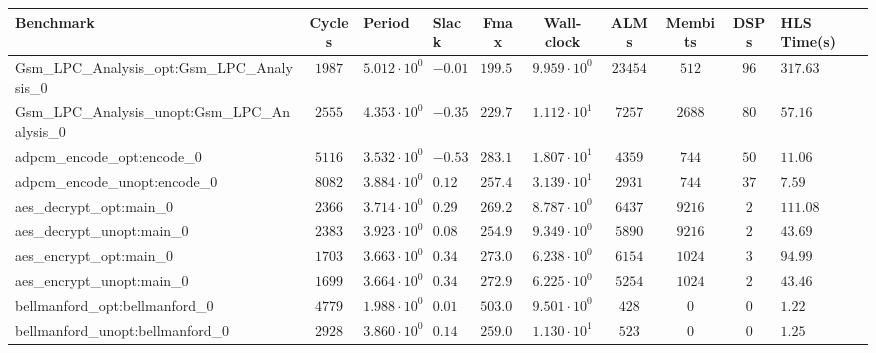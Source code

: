 \begin{tabular}{|l|c|HHc|c|c|c|cH|}
\hline
Benchmark                                       & Cycles       & Period                 & Slack     & Fmax       & Wall-clock              & ALMs       & Membits     & DSPs    & HLS Time(s) \\
\hline
Gsm\_LPC\_Analysis\_opt:Gsm\_LPC\_Analysis\_0   & $ 1987     $ & $ 5.012 \cdot 10^{0} $ & $ -0.01 $ & $ 199.52 $ & $ 9.959 \cdot 10^{0}  $ & $ 23454  $ & $ 512     $ & $ 96  $ & $ 317.63  $ \\
Gsm\_LPC\_Analysis\_unopt:Gsm\_LPC\_Analysis\_0 & $ 2555     $ & $ 4.353 \cdot 10^{0} $ & $ -0.35 $ & $ 229.73 $ & $ 1.112 \cdot 10^{1}  $ & $ 7257   $ & $ 2688    $ & $ 80  $ & $ 57.16   $ \\
adpcm\_encode\_opt:encode\_0                    & $ 5116     $ & $ 3.532 \cdot 10^{0} $ & $ -0.53 $ & $ 283.13 $ & $ 1.807 \cdot 10^{1}  $ & $ 4359   $ & $ 744     $ & $ 50  $ & $ 11.06   $ \\
adpcm\_encode\_unopt:encode\_0                  & $ 8082     $ & $ 3.884 \cdot 10^{0} $ & $ 0.12  $ & $ 257.47 $ & $ 3.139 \cdot 10^{1}  $ & $ 2931   $ & $ 744     $ & $ 37  $ & $ 7.59    $ \\
aes\_decrypt\_opt:main\_0                       & $ 2366     $ & $ 3.714 \cdot 10^{0} $ & $ 0.29  $ & $ 269.25 $ & $ 8.787 \cdot 10^{0}  $ & $ 6437   $ & $ 9216    $ & $ 2   $ & $ 111.08  $ \\
aes\_decrypt\_unopt:main\_0                     & $ 2383     $ & $ 3.923 \cdot 10^{0} $ & $ 0.08  $ & $ 254.91 $ & $ 9.349 \cdot 10^{0}  $ & $ 5890   $ & $ 9216    $ & $ 2   $ & $ 43.69   $ \\
aes\_encrypt\_opt:main\_0                       & $ 1703     $ & $ 3.663 \cdot 10^{0} $ & $ 0.34  $ & $ 273.00 $ & $ 6.238 \cdot 10^{0}  $ & $ 6154   $ & $ 1024    $ & $ 3   $ & $ 94.99   $ \\
aes\_encrypt\_unopt:main\_0                     & $ 1699     $ & $ 3.664 \cdot 10^{0} $ & $ 0.34  $ & $ 272.93 $ & $ 6.225 \cdot 10^{0}  $ & $ 5254   $ & $ 1024    $ & $ 2   $ & $ 43.46   $ \\
bellmanford\_opt:bellmanford\_0                 & $ 4779     $ & $ 1.988 \cdot 10^{0} $ & $ 0.01  $ & $ 503.02 $ & $ 9.501 \cdot 10^{0}  $ & $ 428    $ & $ 0       $ & $ 0   $ & $ 1.22    $ \\
bellmanford\_unopt:bellmanford\_0               & $ 2928     $ & $ 3.860 \cdot 10^{0} $ & $ 0.14  $ & $ 259.07 $ & $ 1.130 \cdot 10^{1}  $ & $ 523    $ & $ 0       $ & $ 0   $ & $ 1.25    $ \\

\end{tabular}
